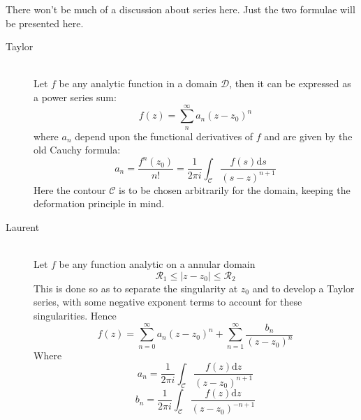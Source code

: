 \documentclass[11pt]{article}
\begin{document}
\begin{sloppypar}
There won\rq{}t be much of a discussion about series here. Just the two formulae will be presented here.
\begin{description}
\item[Taylor] \hfill \\
	Let $f$ be any analytic function in a domain $\mathcal{D}$, then it can be expressed as a power series sum:
$$f(z) = \sum_n^{\infty} a_{n}(z-z_{0})^n$$ where $a_{n}$ depend upon the functional derivatives of $f$ and are given by the old Cauchy formula:
$$a_{n} = \frac{f^n(z_{0})}{n!} = \frac{1}{2\pi i} \int_\mathcal{C} \frac{f(s) \mathrm{d}s}{(s-z)^{n+1}}$$ Here the contour $\mathcal{C}$ is to be chosen arbitrarily for the domain, keeping the deformation principle in mind.
\item[Laurent] \hfill \\
	Let $f$ be any function analytic on a annular domain $$\mathcal{R}_{1} \leq |z - z_{0}| \leq \mathcal{R}_{2}$$ This is done so as to separate the singularity at $z_{0}$ and to develop a Taylor series, with some negative exponent terms to account for these singularities. Hence $$f(z) = \sum_{n=0}^{\infty}a_{n}(z-z_{0})^n  +  \sum_{n=1}^{\infty}\frac{b_{n}}{(z-z_{0})^n}$$
Where $$a_{n} = \frac{1}{2\pi i}\int_{\mathcal{C}}\frac{f(z)\mathrm{d}z}{(z-z_{0})^{n+1}}$$
 $$b_{n} = \frac{1}{2\pi i}\int_{\mathcal{C}}\frac{f(z)\mathrm{d}z}{(z-z_{0})^{-n+1}}$$

\end{description}


\end{sloppypar}
\end{document}
